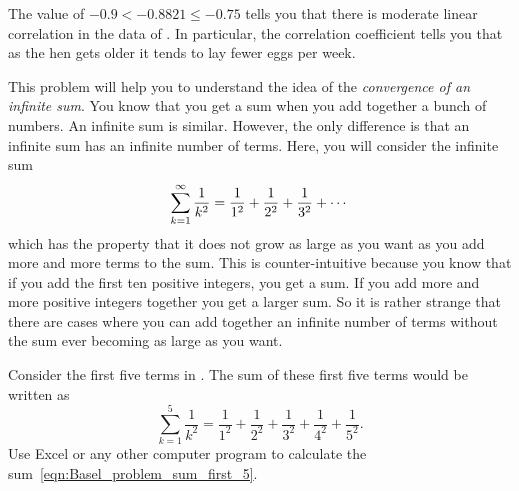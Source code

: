 \documentclass[a4paper,oneside,12pt]{article}
\begin{document}
\begin{problem}
{\begin{solution}
\begin{table}[!htbp]
\centering

\caption{%
  Detailed calculation of the Pearson correlation coefficient for the
  data in .  The column for $x$ is for the age in
  months and the column for $y$ is the number of eggs per week.  Note
  that most values have been rounded to two decimal places in order to
  fit the table.  However, you should only round the final result.
}
\label{tab:age_egg_pearson}
\end{table}

The value of $-0.9 < -0.8821 \leq -0.75$ tells you that there is
moderate linear correlation in the data of .  In
particular, the correlation coefficient tells you that as the hen gets
older it tends to lay fewer eggs per week.
\end{solution}
}{}

\item This problem will help you to understand the idea of the
  \emph{convergence of an infinite sum}.  You know that you get a sum
  when you add together a bunch of numbers.  An infinite sum is
  similar.  However, the only difference is that an infinite sum has
  an infinite number of terms.  Here, you will consider the infinite
  sum
  \begin{equation}
  \label{eqn:Basel_problem}
  \sum_{k=1}^\infty \frac{1}{k^2}
  =
  {
    \frac{1}{1^2}
  } + {
    \frac{1}{2^2}
  } + {
    \frac{1}{3^2}
  } + \cdots
  \end{equation}
  which has the property that it does not grow as large as you want as
  you add more and more terms to the sum.  This is counter-intuitive
  because you know that if you add the first ten positive integers,
  you get a sum.  If you add more and more positive integers together
  you get a larger sum.  So it is rather strange that there are cases
  where you can add together an infinite number of terms without the
  sum ever becoming as large as you want.
  \begin{packedenum}
  \item\label{subprob:Basel_problem_sum_first_5}
    Consider the first five terms in .
    The sum of these first five terms would be written as
    \begin{equation}
    \label{eqn:Basel_problem_sum_first_5}
    \sum_{k=1}^5 \frac{1}{k^2}
    =
    \frac{1}{1^2} + \frac{1}{2^2} + \frac{1}{3^2}
    +
    \frac{1}{4^2} + \frac{1}{5^2}.
    \end{equation}
    Use Excel or any other computer program to calculate the
    sum~\eqref{eqn:Basel_problem_sum_first_5}.


\end{packedenum}
\end{problem}
\end{document}
